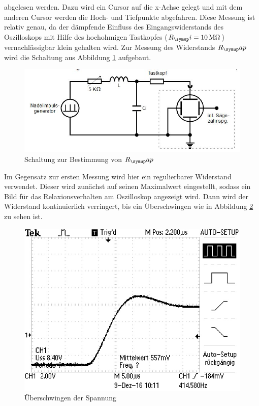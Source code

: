 abgelesen werden. Dazu wird ein Cursor auf die x-Achse gelegt und mit dem anderen Cursor
werden die Hoch- und Tiefpunkte abgefahren. Diese Messung ist relativ genau, da
der dämpfende Einfluss
des Eingangswiderstands des Oszilloskops mit Hilfe des hochohmigen Tastkopfes
($R_\su{i}=10\,\si{\mega\ohm}$) vernachlässigbar klein gehalten wird.
Zur Messung des Widerstands $R_\su{ap}$ wird die Schaltung aus Abbildung
\ref{fig:rapschlt} aufgebaut. \\
\begin{figure}[h]
  \centering
  \includegraphics[width=\textwidth]{Bilder/RapSchalt.JPG}
  \caption{Schaltung zur Bestimmung von $R_\su{ap}$\,\cite{354}}
  \label{fig:rapschlt}
\end{figure}
Im Gegensatz zur ersten Messung wird hier ein regulierbarer Widerstand verwendet.
Dieser wird zunächst auf seinen Maximalwert eingestellt, sodass ein Bild
für das Relaxionsverhalten am Oszilloskop angezeigt wird. Dann wird der
Widerstand kontinuierlich verringert, bis ein Überschwingen wie in
Abbildung \ref{fig:aperid} zu sehen ist.
\begin{figure}[h]
  \centering
  \includegraphics{Bilder/aperid.JPG}
  \caption{Überschwingen der Spannung}
  \label{fig:aperid}
\end{figure} \\
